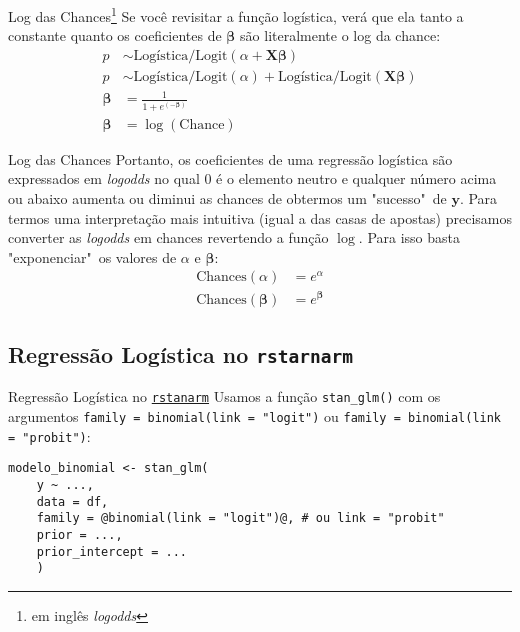\begin{frame}{Log das Chances\footnote{em inglês \textit{logodds}}}
	Se você revisitar a função logística, verá que ela tanto a constante quanto
	os coeficientes de $\boldsymbol{\beta}$ são literalmente o log da
	chance:
	$$
		\begin{aligned}
			p                  & \sim \text{Logística/Logit}(\alpha +  \mathbf{X} \boldsymbol{\beta} )                        \\
			p                  & \sim \text{Logística/Logit}(\alpha) + \text{Logística/Logit}( \mathbf{X} \boldsymbol{\beta}) \\
			\boldsymbol{\beta} & = \frac{1}{1 + e^{(-\boldsymbol{\beta})}}                                                    \\
			\boldsymbol{\beta} & = \log(\text{Chance})
		\end{aligned}
	$$
\end{frame}

\begin{frame}{Log das Chances}
	Portanto, os coeficientes de uma regressão logística são expressados em
	\textit{logodds} no qual $0$ é o elemento neutro e qualquer número acima ou
	abaixo aumenta ou diminui as chances de obtermos um "sucesso"~de
	$\boldsymbol{y}$. Para termos uma interpretação mais intuitiva
	(igual a das casas de apostas) precisamos converter as \textit{logodds}
	em chances revertendo a função $\log$. Para isso basta "exponenciar"~os
	valores de $\alpha$ e $\boldsymbol{\beta}$:
	$$
		\begin{aligned}
			\text{Chances}(\alpha)               & = e^\alpha               \\
			\text{Chances}({\boldsymbol{\beta}}) & = e^{\boldsymbol{\beta}}
		\end{aligned}
	$$
\end{frame}

\subsection{Regressão Logística no \texttt{rstarnarm}}
\begin{frame}[fragile]{Regressão Logística no \href{http://mc-stan.org/rstanarm/}{\texttt{rstanarm}}}
	Usamos a função \texttt{stan\_glm()} com os argumentos \texttt{family = binomial(link = "logit")} ou
	\texttt{family = binomial(link = "probit")}:
	\vfill
	\begin{lstlisting}[basicstyle=\small]
    modelo_binomial <- stan_glm(
    y ~ ...,
    data = df,
    family = @binomial(link = "logit")@, # ou link = "probit"
    prior = ...,
    prior_intercept = ...
    )
    \end{lstlisting}
\end{frame}

